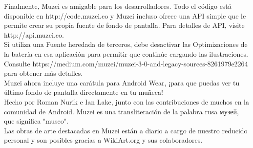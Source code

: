 \documentclass[12pt,a4paper]{article}
\begin{document}
Finalmente, Muzei es amigable para los desarrolladores. Todo el código está disponible en http://code.muzei.co y Muzei incluso ofrece una API simple que le permite crear su propia fuente de fondo de pantalla. Para detalles de API, visite http://api.muzei.co.\\

Si utiliza una Fuente heredada de terceros, debe desactivar las Optimizaciones de la batería en esa aplicación para permitir que continúe cargando las ilustraciones. Consulte https://medium.com/muzei/muzei-3-0-and-legacy-sources-8261979e2264 para obtener más detalles.\\


Muzei ahora incluye una carátula para Android Wear, ¡para que puedas ver tu último fondo de pantalla directamente en tu muñeca!\\


Hecho por Roman Nurik e Ian Lake, junto con las contribuciones de muchos en la comunidad de Android. Muzei es una transliteración de la palabra rusa музей, que significa "museo".\\

Las obras de arte destacadas en Muzei están a diario a cargo de nuestro reducido personal y son posibles gracias a WikiArt.org y sus colaboradores.\\
\end{document}
